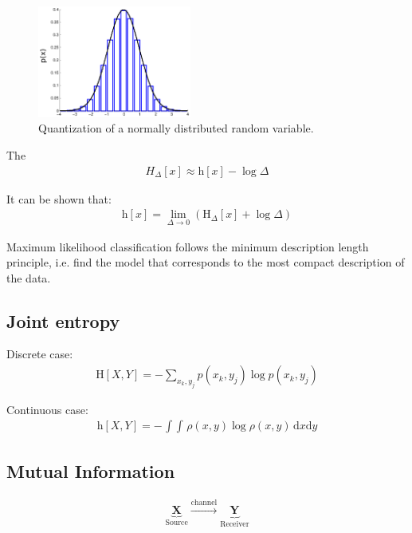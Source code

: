 \begin{figure}
	\centering
	\includegraphics[width=0.45\textwidth]{./lecture12/gauss_quant.pdf}
	\caption{Quantization of a normally distributed random variable.}
\end{figure}
The 
\begin{align}
	{H}_\Delta[x] \approx \mathrm{h}[x] - \log \Delta
\end{align}

It can be shown that:
\begin{align}
	\mathrm{h}[x] = \lim_{\Delta \rightarrow 0} \left( \mathrm{H}_\Delta[x] + \log \Delta \right)
\end{align}

Maximum likelihood classification follows the minimum description length principle, 
i.e. find the model that corresponds to the most compact description of the data.

\subsection{Joint entropy}
\begin{definition}
Discrete case:
\begin{align*}
		\mathrm{H}[X,Y] = -\sum_{x_k,y_j} p(x_k,y_j) \log p(x_k,y_j)
\end{align*}

Continuous case:
\begin{align*}
		\mathrm{h}[X,Y] = - \mathop{\int \! \! \! \int} \rho(x,y) \log \rho(x,y) \, \mathrm{d}x \mathrm{d}y
\end{align*}
\end{definition}

\subsection{Mutual Information}

\begin{align*}
	\underbrace{\mathbf{X}}_{\text{Source}} \stackrel{\text{channel}}{\longrightarrow} \underbrace{\mathbf{Y}}_{\text{Receiver}}
\end{align*}


